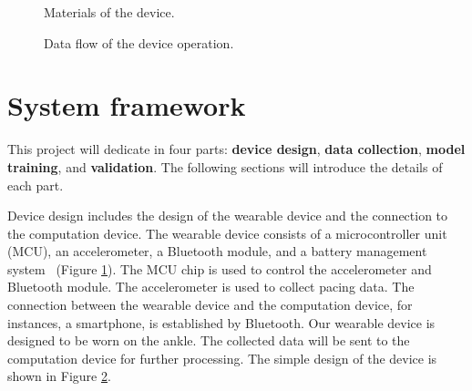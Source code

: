 \documentclass[10pt,twocolumn,letterpaper]{article}
\begin{document}
\begin{figure}[t]
    \centering
    \caption{Materials of the device.}
    \label{fig:f3}
\end{figure}

\begin{figure}[t]
    \centering
        \rule{0pt}{2in}
    \caption{Data flow of the device operation.}
    \label{fig:f4}
\end{figure}

\section{System framework}
\label{sec:framework}

This project will dedicate in four parts: \textbf{device design}, \textbf{data collection}, \textbf{model training}, and \textbf{validation}. The following sections will introduce the details of each part.

Device design includes the design of the wearable device and the connection to the computation device. The wearable device consists of a microcontroller unit (MCU), an accelerometer, a Bluetooth module, and a battery management system~\cite{pardoel2019wearable} (Figure \ref{fig:f3}). The MCU chip is used to control the accelerometer and Bluetooth module. The accelerometer is used to collect pacing data. The connection between the wearable device and the computation device, for instances, a smartphone, is established by Bluetooth. Our wearable device is designed to be worn on the ankle. The collected data will be sent to the computation device for further processing. The simple design of the device is shown in Figure \ref{fig:f4}.
\end{document}
